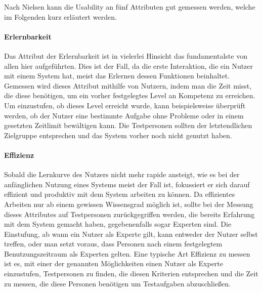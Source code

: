 Nach Nielsen kann die Usability an fünf Attributen gut gemessen werden, welche im Folgenden kurz erläutert werden\cite{Nielsen.1995?}.

\paragraph{Erlernbarkeit}
Das Attribut der Erlernbarkeit ist in vielerlei Hinsicht das fundamentalste von allen hier aufgeführten.
Dies ist der Fall, da die erste Interaktion, die ein Nutzer mit einem System hat, meist das Erlernen dessen Funktionen beinhaltet.
Gemessen wird dieses Attribut mithilfe von Nutzern, indem man die Zeit misst, die diese benötigen, um ein vorher festgelegtes Level an Kompetenz zu erreichen.
Um einzustufen, ob dieses Level erreicht wurde, kann beispielsweise überprüft werden, ob der Nutzer eine bestimmte Aufgabe ohne Probleme oder in einem gesetzten Zeitlimit bewältigen kann.
Die Testpersonen sollten der letztendlichen Zielgruppe entsprechen und das System vorher noch nicht genutzt haben.

\paragraph{Effizienz}
Sobald die Lernkurve des Nutzers nicht mehr rapide ansteigt, wie es bei der anfänglichen Nutzung eines Systems meist der Fall ist, fokussiert er sich darauf effizient  und produktiv mit dem System arbeiten zu können.
Da effizientes Arbeiten nur ab einem gewissen Wissensgrad möglich ist, sollte bei der Messung dieses Attributes auf Testpersonen zurückgegriffen werden, die bereits Erfahrung mit dem System gemacht haben, gegebenenfalls sogar Experten sind.
Die Einstufung, ab wann ein Nutzer als Experte gilt, kann entweder der Nutzer selbst treffen, oder man setzt voraus, dass Personen nach einem festgelegtem Benutzungszeitraum als Experten gelten.
Eine typische Art Effizienz zu messen ist es, mit einer der genannten Möglichkeiten einen Nutzer als Experte einzustufen, Testpersonen zu finden, die diesen Kriterien entsprechen und die Zeit zu messen, die diese Personen benötigen um Testaufgaben abzuschließen.

